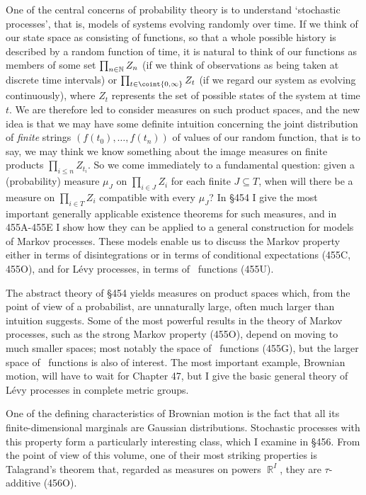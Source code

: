 One of the central concerns of probability theory is to understand
`stochastic processes', that is, models of systems evolving
randomly over time.   If we think of our state space as consisting
of functions, so that a whole possible history is described by a
random function of time, it is natural to think of our functions as
members of some set $\prod_{n\in\Bbb N}Z_n$ (if we think of
observations as being taken at discrete time intervals) or
$\prod_{t\in\coint{0,\infty}}Z_t$ (if we regard our system as
evolving continuously), where $Z_t$ represents the set of possible
states
of the system at time $t$.   We are therefore led to consider
measures on such product spaces, and the new idea is that we may
have some definite intuition concerning the joint distribution of
{\it finite} strings $(f(t_0),\ldots,f(t_n))$ of values of our
random function, that is to say, we may think we know something
about the image measures on finite products
$\prod_{i\le n}Z_{t_i}$.   So we come immediately to a fundamental
question:
given a (probability) measure $\mu_J$ on $\prod_{i\in J}Z_i$ for
each finite $J\subseteq T$, when will there be a measure on
$\prod_{i\in T}Z_i$ compatible with every $\mu_J$?   In \S454 I give the
most important generally applicable existence theorems for such
measures, and in 455A-455E %
I show how they can be applied to a general
construction for models of Markov processes.   These models enable us to
discuss the Markov property either in terms of disintegrations or in terms
of conditional expectations (455C, 455O), and for L\'evy processes, in
terms of \imp\ functions (455U).

The abstract theory of \S454 yields measures on product spaces which,
from the point of view of a probabilist, are unnaturally large, often
much larger than intuition suggests.   Some of the most powerful results in
the theory of Markov processes, such as the strong Markov property (455O),
depend on moving to much smaller spaces;  most notably the space of
\cadlag\ functions (455G), but the larger space of \callal\ functions is
also of interest.   The most important example, Brownian motion,
will have to wait for Chapter
47, but I give the basic general theory of L\'evy processes in complete
metric groups.

One of the defining characteristics of Brownian motion is the fact that
all its finite-dimensional marginals are Gaussian distributions.
Stochastic processes with this
property form a particularly interesting class, which I examine in
\S456.   From the point of view of this volume, one of their most
striking properties is Talagrand's theorem
that, regarded as measures on powers $\BbbR^I$, they are $\tau$-additive
(456O).

